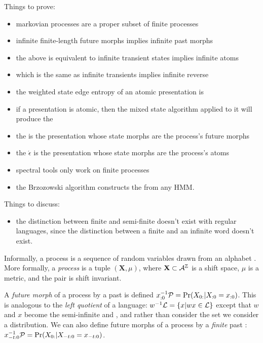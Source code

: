 \documentclass[prl,twocolumn,showpacs,superscriptaddress,preprintnumbers,floatfix]{revtex4-1}
\newcommand{\etomata}{\ensuremath{\acute{\epsilon}}\text{tomata}\xspace}
\begin{document}
Things to prove:
\begin{itemize}
  \item markovian processes are a proper subset of finite processes
  \item infinite finite-length future morphs implies infinite past morphs
  \item the above is equivalent to infinite transient states implies infinite
    atoms
  \item which is the same as infinite transients implies infinite reverse \eM
  \item the weighted state edge entropy of an atomic presentation is \hmu
  \item if a presentation is atomic, then the mixed state algorithm applied to
    it will produce the \eM
  \item the \eM is the presentation whose state morphs are the process's future
    morphs
  \item the \etomata is the presentation whose state morphs are the process's atoms
  \item spectral tools only work on finite processes
  \item the Brzozowski algorithm constructs the \eM from any HMM.
\end{itemize}

Things to discuss:
\begin{itemize}
  \item the distinction between finite and semi-finite doesn't exist with
    regular languages, since the distinction between a finite and an infinite
    word doesn't exist.
\end{itemize}

Informally, a process is a sequence of random variables drawn from an alphabet
\MeasAlphabet. More formally, a \emph{process} \Process is a tuple $(\mathbf{X},
\mu)$, where $\mathbf{X} \subset \mathcal{A}^\mathbb{Z}$ is a shift space,
$\mu$ is a metric, and the pair is shift invariant.

A \emph{future morph} of a process \Process by a past \past is defined
${x}_{:0}^{-1}\mathcal{P} = \Pr({X}_{0:} | {X}_{:0} = {x}_{:0})$. This is analogous to the
\emph{left quotient} of a language: $w^{-1}\mathcal{L} = \{ x | wx \in \mathcal{L}
\}$ except that $w$ and $x$ become the semi-infinite \past and \future, and
rather than consider the set we consider a distribution. We can also define
future morphs of a process by a \emph{finite} past :
${x}_{-t:0}^{-1}\mathcal{P} = \Pr({X}_{0:} | {X}_{-t:0} = {x}_{-t:0})$.
\end{document}
